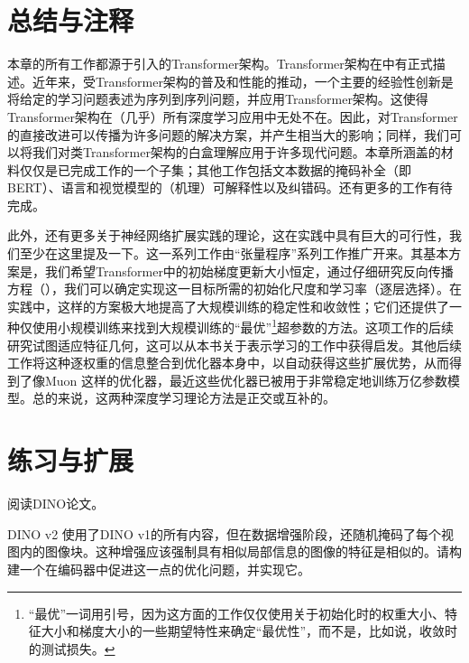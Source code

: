 \documentclass[../../book-main_zh.tex]{subfiles}
\begin{document}
\section{总结与注释}

本章的所有工作都源于\citet{vaswani2017attention}引入的Transformer架构。Transformer架构在中有正式描述。近年来，受Transformer架构的普及和性能的推动，一个主要的经验性创新是将给定的学习问题表述为序列到序列问题，并应用Transformer架构。这使得Transformer架构在（几乎）所有深度学习应用中无处不在。因此，对Transformer的直接改进可以传播为许多问题的解决方案，并产生相当大的影响；同样，我们可以将我们对类Transformer架构的白盒理解应用于许多现代问题。本章所涵盖的材料仅仅是已完成工作的一个子集；其他工作包括文本数据的掩码补全（即BERT）\citep{devlin2019bert,yu2024white}、语言和视觉模型的（机理）可解释性\citep{bai2024improving}以及纠错码\citep{zheng2025white}。还有更多的工作有待完成。

此外，还有更多关于神经网络扩展实践的理论，这在实践中具有巨大的可行性，我们至少在这里提及一下。这一系列工作由“张量程序”系列工作\citep{yang2022tensor}推广开来。其基本方案是，我们希望Transformer中的初始梯度更新大小恒定，通过仔细研究反向传播方程（），我们可以确定实现这一目标所需的初始化尺度和学习率（逐层选择）。在实践中，这样的方案极大地提高了大规模训练的稳定性和收敛性；它们还提供了一种仅使用小规模训练来找到大规模训练的“最优”\footnote{“最优”一词用引号，因为这方面的工作仅仅使用关于初始化时的权重大小、特征大小和梯度大小的一些期望特性来确定“最优性”，而不是，比如说，收敛时的测试损失。}超参数的方法。这项工作的后续研究试图适应特征几何\citep{bernstein2024oldoptimizernewnorm}，这可以从本书关于表示学习的工作中获得启发。其他后续工作将这种逐权重的信息整合到优化器本身中，以自动获得这些扩展优势，从而得到了像Muon \citep{jordan6muon}这样的优化器，最近这些优化器已被用于非常稳定地训练万亿参数模型\citep{moonshot2025kimi}。总的来说，这两种深度学习理论方法是正交或互补的。


\section{练习与扩展}

\begin{exercise}
    阅读DINO论文\cite{caron2021emerging}。
\end{exercise}

\begin{exercise}
    DINO v2 \cite{oquab2023dinov2}使用了DINO v1的所有内容，但在数据增强阶段，还随机掩码了每个视图内的图像块。这种增强应该强制具有相似局部信息的图像的特征是相似的。请构建一个在编码器中促进这一点的优化问题，并实现它。
\end{exercise}
\end{document}
